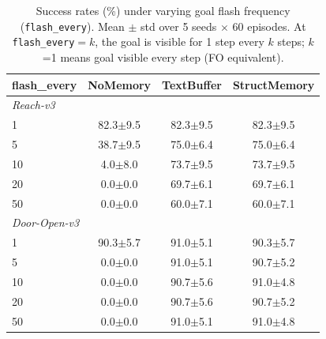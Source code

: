 \begin{table}[t]
\centering
\caption{Success rates (\%) under varying goal flash frequency (\texttt{flash\_every}). Mean $\pm$ std over 5 seeds $\times$ 60 episodes. At \texttt{flash\_every}$=k$, the goal is visible for 1 step every $k$ steps; $k$=1 means goal visible every step (FO equivalent).}
\label{tab:flash_every}
\begin{tabular}{l ccc}
\toprule
flash\_every & NoMemory & TextBuffer & StructMemory \\
\midrule
\multicolumn{4}{l}{\textit{Reach-v3}} \\
1  & 82.3$\pm$9.5 & 82.3$\pm$9.5 & 82.3$\pm$9.5 \\
5  & 38.7$\pm$9.5 & 75.0$\pm$6.4 & 75.0$\pm$6.4 \\
10 & 4.0$\pm$8.0 & 73.7$\pm$9.5 & 73.7$\pm$9.5 \\
20 & 0.0$\pm$0.0 & 69.7$\pm$6.1 & 69.7$\pm$6.1 \\
50 & 0.0$\pm$0.0 & 60.0$\pm$7.1 & 60.0$\pm$7.1 \\
\midrule
\multicolumn{4}{l}{\textit{Door-Open-v3}} \\
1  & 90.3$\pm$5.7 & 91.0$\pm$5.1 & 90.3$\pm$5.7 \\
5  & 0.0$\pm$0.0 & 91.0$\pm$5.1 & 90.7$\pm$5.2 \\
10 & 0.0$\pm$0.0 & 90.7$\pm$5.6 & 91.0$\pm$4.8 \\
20 & 0.0$\pm$0.0 & 90.7$\pm$5.6 & 90.7$\pm$5.2 \\
50 & 0.0$\pm$0.0 & 91.0$\pm$5.1 & 91.0$\pm$4.8 \\
\bottomrule
\end{tabular}
\end{table}

